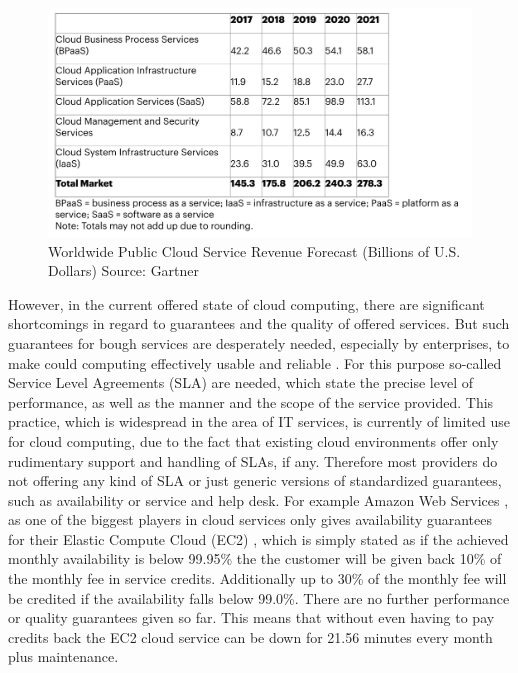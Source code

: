 \begin{figure}[ht]
	\centering
	\includegraphics[width=0.7\linewidth]{chapters/chapter1/CloudRev}
	\caption{Worldwide Public Cloud Service Revenue Forecast (Billions of U.S. Dollars) Source: Gartner \cite{gart19}}
	\label{fig:cloudrev}
\end{figure}

However, in the current offered state of cloud computing, there are significant shortcomings in regard to guarantees and the quality of offered services. But such guarantees for bough services are desperately needed, especially by enterprises, to make could computing  effectively usable  \cite{DMTF2010} and reliable  \cite{JTC}. 
For this purpose so-called Service Level Agreements (SLA) are needed, which state the precise level of performance, as well as the manner and the scope of the service provided. This practice, which is widespread in the area of IT services, is currently of limited use for cloud computing, due to the fact that existing cloud environments offer only rudimentary support and handling of SLAs, if any. Therefore most providers do not offering any kind of SLA or just generic versions of standardized guarantees, such as availability or service and help desk. For example Amazon Web Services  \cite{AWS}, as one of the biggest players in cloud services only gives availability guarantees for their Elastic Compute Cloud (EC2)  \cite{EC2SLA}, which is simply stated as if the achieved monthly availability is below 99.95\% the the customer will be given back 10\% of the monthly fee in service credits. Additionally up to 30\% of the monthly fee will be credited if the availability falls below 99.0\%. There are no further performance or quality guarantees given so far. This means that without even having to pay credits back the EC2 cloud service can be down for 21.56 minutes every month plus maintenance. 

